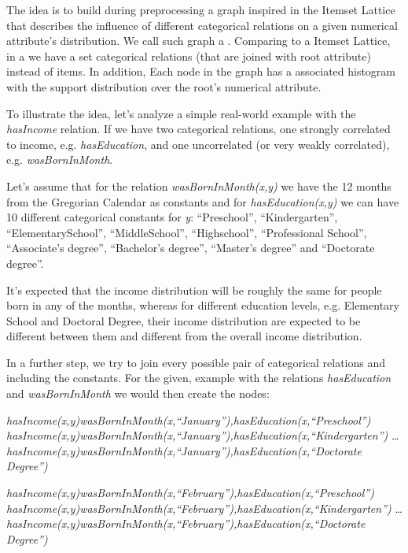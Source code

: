 The idea is to build during preprocessing a graph inspired in the Itemset Lattice that describes the influence of
different categorical relations on a given numerical attribute's distribution. We call such graph a \graphname.
Comparing to a Itemset Lattice, in a \graphname we have a set categorical relations (that are joined with root
attribute) instead of items. In addition, Each node in the graph has a associated histogram with the support
distribution over the root's numerical attribute.

To illustrate the idea, let's analyze a simple real-world example with the \emph{hasIncome} relation. If we have two
categorical relations, one strongly correlated to income, e.g. \emph{hasEducation}, and one uncorrelated (or very weakly
correlated), e.g. \emph{wasBornInMonth}.

Let's assume that for the relation \emph{wasBornInMonth(x,y)} we have the 12 months from the Gregorian Calendar as
constants and for \emph{hasEducation(x,y)} we can have 10 different categorical constants for \emph{y}: ``Preschool'',
``Kindergarten'', ``ElementarySchool'', ``MiddleSchool'', ``Highschool'', ``Professional School'', ``Associate's
degree'', ``Bachelor's degree'', ``Master's degree'' and ``Doctorate degree''. 

It's expected that the income distribution will be roughly the same for people born in any of the months, whereas
for different education levels, e.g. Elementary School and Doctoral Degree, their income distribution are expected to be
different between them and different from the overall income distribution.

In a further step, we try to join every possible pair of categorical relations and including the constants. For the
given, example with the relations \emph{hasEducation} and \emph{wasBornInMonth} we would then create the nodes:

  \emph{hasIncome(x,y)wasBornInMonth(x,``January''),hasEducation(x,``Preschool'')} \newline
  \emph{hasIncome(x,y)wasBornInMonth(x,``January''),hasEducation(x,``Kindergarten'')} \newline
  \dots \newline
  \emph{hasIncome(x,y)wasBornInMonth(x,``January''),hasEducation(x,``Doctorate Degree'')} \newline

  \emph{hasIncome(x,y)wasBornInMonth(x,``February''),hasEducation(x,``Preschool'')} \newline
  \emph{hasIncome(x,y)wasBornInMonth(x,``February''),hasEducation(x,``Kindergarten'')} \newline
  \dots \newline
  \emph{hasIncome(x,y)wasBornInMonth(x,``February''),hasEducation(x,``Doctorate Degree'')} \newline
 
